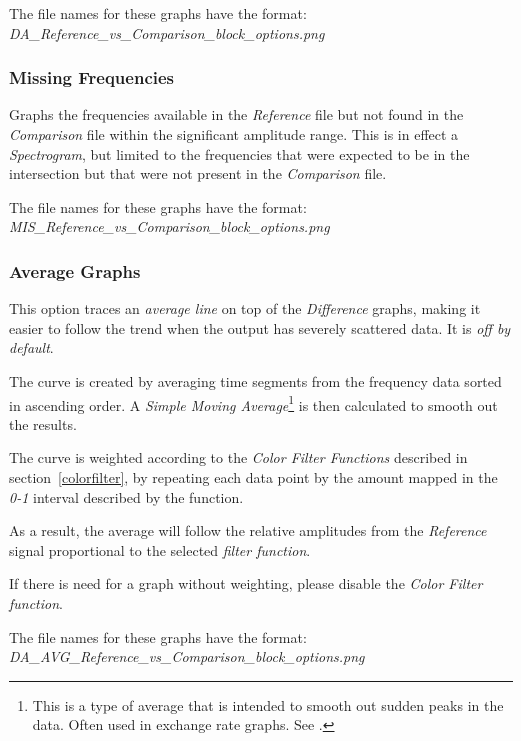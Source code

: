 \documentclass[10pt,a4paper]{report}
\begin{document}
\begin{appendices}
The file names for these graphs have the format:\\ \textit{DA\_Reference\_vs\_Comparison\_block\_options.png}

\subsubsection{Missing Frequencies} 

Graphs the frequencies available in the \textit{Reference} file but not found in the \textit{Comparison} file within the significant amplitude range. This is in effect a \textit{Spectrogram}, but limited to the frequencies that were expected to be in the intersection but that were not present in the \textit{Comparison} file.

The file names for these graphs have the format:\\ \textit{MIS\_Reference\_vs\_Comparison\_block\_options.png}

\subsubsection{Average Graphs}
\label{averaged}

This option traces an \textit{average line} on top of the \textit{Difference} graphs, making it easier to follow the trend when the output has severely scattered data. It is \textit{off by default}.

The curve is created by averaging time segments from the frequency data sorted in ascending order. A \textit{Simple Moving Average}\footnote{This is a type of average that is intended to smooth out sudden peaks in the data. Often used in exchange rate graphs. See \cite{sma}.} is then calculated to smooth out the results.

The curve is weighted according to the \textit{Color Filter Functions} described in section~\ref{colorfilter}, by repeating each data point by the amount mapped in the \textit{0-1} interval described by the function.

As a result, the average will follow the relative amplitudes from the \textit{Reference} signal proportional to the selected \textit{filter function}.

If there is need for a graph without weighting, please disable the \textit{Color Filter function}.

The file names for these graphs have the format:\\ \textit{DA\_AVG\_Reference\_vs\_Comparison\_block\_options.png}


\end{appendices}
\end{document}
